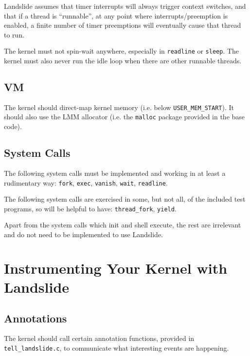 \documentclass{article}
\begin{document}
Landslide assumes that timer interrupts will always trigger context switches, and that if a thread is ``runnable'', at any point where interrupts/preemption is enabled, a finite number of timer preemptions will eventually cause that thread to run.

The kernel must not spin-wait anywhere, especially in \texttt{readline} or \texttt{sleep}. The kernel must also never run the idle loop when there are other runnable threads.

\subsection{VM}

The kernel should direct-map kernel memory (i.e. below \texttt{USER\_MEM\_START}). It should also use the LMM allocator (i.e. the \texttt{malloc} package provided in the base code).

\subsection{System Calls}

The following system calls must be implemented and working in at least a rudimentary way:
\texttt{fork}, \texttt{exec}, \texttt{vanish}, \texttt{wait}, \texttt{readline}.

The following system calls are exercised in some, but not all, of the included test programs, so will be helpful to have:
\texttt{thread\_fork}, \texttt{yield}.

Apart from the system calls which init and shell execute, the rest are irrelevant and do not need to be implemented to use Landslide.

\section{Instrumenting Your Kernel with Landslide}

\subsection{Annotations}
\label{sec:tell}

The kernel should call certain annotation functions, provided in \texttt{tell\_landslide.c}, to communicate what interesting events are happening.
\end{document}

